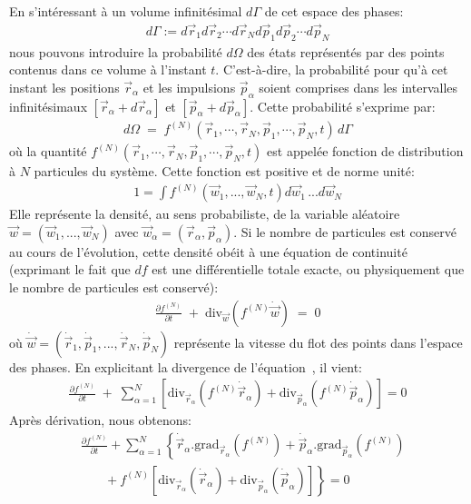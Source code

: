 En s'intéressant à un volume infinitésimal $d\Gamma$ de cet espace des phases:
\begin{align*}
	d\Gamma:=d\vec{r}_{1}d\vec{r}_{2}\cdots d\vec{r}_{N}d\vec{p}_{1}d\vec{p}_{2}\cdots d\vec{p}_{N}
\end{align*}
nous pouvons introduire la probabilité $d\Omega$ des états représentés par des points contenus dans ce volume à l'instant $t$. C'est-à-dire, la probabilité
pour qu'à cet instant les positions $\vec{r}_{\alpha}$ et les {impulsion}s $\vec{p}_{\alpha}$ soient comprises dans les intervalles
infinitésimaux $[\vec{r}_{\alpha }+d\vec{r}_{\alpha}]$ et $[\vec{p}_{\alpha}+d\vec{p}_{\alpha}]$. Cette probabilité s'exprime
par:
\begin{align*}
	d\Omega\;=\;f^{(N)}(\vec{r}_{1},\cdots,\vec{r}_{N},\vec{p}_{1},\cdots,\vec{p}_{N},t)\,d\Gamma
\end{align*}
où la quantité $f^{(N)}(\vec{r}_{1},\cdots,\vec{r} _{N},\vec{p}_{1},\cdots,\vec{p}_{N},t)$ est appelée fonction de distribution à $N$
particules du système. Cette fonction est positive et de norme unité:
\begin{align*}
	1=\int f^{\left(N\right)}\left(\vec{w}_{1},...,\vec{w}_{N},t\right)d\vec{w}_{1}\,...d\vec{w}_{N}
\end{align*}
Elle représente la densité, au sens probabiliste, de la variable aléatoire $\vec{w}=(\vec{w}_{1},...,\vec{w}_{N})$ avec
$\vec{w}_{\alpha}=\left(  \vec{r}_{\alpha},\vec{p}_{\alpha}\right) $. Si le nombre de particules est conservé au cours de l'évolution, cette
densité obéit à une équation de continuité (exprimant le fait que $df$ est une différentielle totale exacte, ou physiquement que le nombre de
particules est conservé):
\begin{align}
	\frac{\partial f^{(N)}}{\partial t}\;+\;\mathrm{div}_{\vec{w}}(f^{(N)}\dot{\vec{w}})\;=\;0\label{continu}%
\end{align}
où $\dot{\vec{w}}=(\dot{\vec{r}}_{1},\dot{\vec{p}}_{1} ,...,\dot{\vec{r}}_{N},\dot{\vec{p}}_{N})$ représente la vitesse du flot des
points dans l'espace des phases. En explicitant la divergence de l'équation~, il vient:
\begin{align*}
	\frac{\partial f^{(N)}}{\partial t}\;+\;\sum_{\alpha=1}^{N}\left[\mathrm{div}_{\vec{r}_{\alpha}}\left(  f^{(N)}\dot{\vec{r}}_{\alpha
	}\right)  +\mathrm{div}_{\vec{p}_{\alpha}}\left(  f^{(N)}\dot{\vec{p}}_{\alpha}\right)  \right]=0
\end{align*}
Après dérivation, nous obtenons:
\begin{align*}
	&  \frac{\partial f^{(N)}}{\partial t}+\displaystyle\sum\limits_{\alpha=1}%
	^{N}\left\{  \dot{\vec{r}}_{\alpha}.\mathrm{grad}_{\vec{r}_{\alpha}%
	}\left(  f^{(N)}\right)  +\dot{\vec{p}}_{\alpha}.\mathrm{grad}%
	_{\vec{p}_{\alpha}}\left(  f^{(N)}\right)  \right. \\
	&  \,\;\;\;\;\;\;\;\left.  +~f^{(N)}\left[  \mathrm{div}_{\vec{r}_{\alpha}%
	}\left(  \dot{\vec{r}}_{\alpha}\right)  +\mathrm{div}_{\vec{p}_{\alpha}%
	}\left(  \dot{\vec{p}}_{\alpha}\right)  \right]  \right\}=0
\end{align*}

